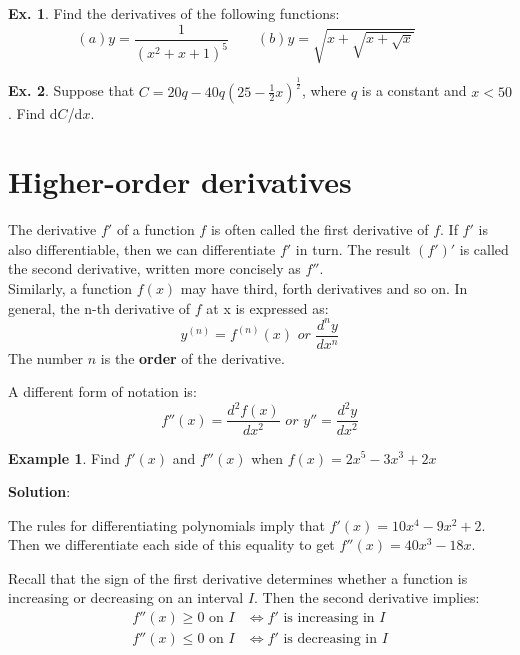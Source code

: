 \documentclass[10pt,a4paper]{book}
\theoremstyle{definition}\newtheorem{definition}{Definition}
\theoremstyle{definition}\newtheorem{fact}{Fact}
\theoremstyle{definition}\newtheorem{ex}{Ex.}
\theoremstyle{definition}\newtheorem{project}{Project}
\theoremstyle{definition}\newtheorem{problem}{Problem}
\theoremstyle{definition}\newtheorem{example}{Example}
\numberwithin{theorem}{chapter}
\numberwithin{corollary}{chapter}
\numberwithin{assumption}{chapter}
\numberwithin{definition}{chapter}
\numberwithin{prop}{chapter}
\numberwithin{notation}{chapter}
\numberwithin{problem}{chapter}
\numberwithin{example}{chapter}
\numberwithin{fact}{chapter}
\numberwithin{ex}{chapter}
\begin{document}
	\begin{ex}
		Find the derivatives of the following functions:
		\begin{equation*}
			(a) y=\frac{1}{(x^2+x+1)^5} \qquad
			(b) y=\sqrt{x+\sqrt{x+\sqrt{x}}} \qquad
		\end{equation*}
	\end{ex}
	
	\begin{ex}
		Suppose that $C=20q-40q(25-\frac{1}{2}x)^{\frac{1}{2}}$, where $q$ is a constant and $x<50$. Find d$C$/d$x$.
	\end{ex}
	
	\section{Higher-order derivatives}
	The derivative $f'$ of a function $f$ is often called the first derivative of $f$. If $f'$ is also differentiable, then we can differentiate $f'$ in turn. The result $(f')'$ is called the second derivative, written more concisely as $f''$.
	\\
	Similarly, a function $f(x)$ may have third, forth derivatives and so on. In general, the n-th derivative of $f$ at x is expressed as:
	$$y^{(n)} = f^{(n)}(x) \,\, or \,\, \frac{d^ny}{dx^n}$$
	The number $n$ is the \textbf{order} of the derivative.
	
	A different form of notation is:
	$$f''(x) = \frac{d^2f(x)}{dx^2} \,\,or\,\, y''=\frac{d^2y}{dx^2} $$
	
	\begin{example}
		Find $f'(x)$ and $f''(x)$ when $f(x) = 2x^5-3x^3+2x$
		
		\textbf{Solution}:
		
		The rules for differentiating polynomials imply that $f'(x) = 10x^4 - 9x^2 + 2$. Then we differentiate each side of this equality to get $f''(x) = 40x^3 - 18x$.
	\end{example}
	
	Recall that the sign of the first derivative determines whether a function is increasing or decreasing on an interval $I$. Then the second derivative implies:
	\begin{align*}
		f''(x) \geq 0 \text{ on } I & \Leftrightarrow f' \text{ is increasing in } I \\
		f''(x) \leq 0 \text{ on } I & \Leftrightarrow f' \text{ is decreasing in } I \\
	\end{align*}
	
\end{document}
